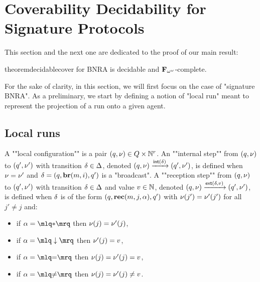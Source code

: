 \section{Coverability Decidability for Signature Protocols}
\label{sec:cover-decidability}

This section and the next one are dedicated to the proof of our main result:

\begin{restatable}{theorem}{decidablecover}
\label{thm:decidable-cover}
\COVER for BNRA is decidable and $\mathbf{F}_{\omega^\omega}$-complete.
\end{restatable}

For the sake of clarity, in this section, we will first focus on the case of "signature BNRA". 
As a preliminary, we start by defining a notion of "local run" meant to represent the projection of a run onto a given agent.

\subsection{Local runs}
\AP A ""local configuration"" is a pair $(q, \nu) \in Q \times \mathbb{N}^r$.  
\AP An ""internal step"" from $(q,\nu)$ to $(q',\nu')$ with transition $\delta \in \Delta$, denoted $(q,\nu) \xrightarrow{\mathsf{int}(\delta)} (q',\nu')$, is defined when $\nu = \nu'$ and $\delta =(q, \textbf{br}(m, i), q')$ is a "broadcast".  
\AP A ""reception step"" from $(q,\nu)$ to $(q',\nu')$ with transition $\delta \in \Delta$ and value $v \in \mathbb{N}$, denoted $(q,\nu) \xrightarrow{\mathsf{ext}(\delta,v)} (q',\nu')$, is defined when $\delta$ is of the form $(q,\textbf{rec}(m, j, \alpha),q')$ with $\nu(j') = \nu'(j')$ for all $j' \neq j$ and:
	
	\begin{minipage}[t]{6cm}
		\begin{itemize}
			\item if $\anact = \quotemarks{\dummyact}$ 
			then $\nu(j) = \nu'(j)$,
			\item if $\anact = \quotemarks{\enregact}$ then $\nu'(j) = v$,
		\end{itemize}
	\end{minipage}
	\begin{minipage}[t]{6cm}
		\begin{itemize}
			\item if $\anact = \quotemarks{\eqtestact}$ then $\nu(j) = \nu'(j)= v$,
			\item if $\anact = \quotemarks{\diseqtestact}$ then $\nu(j) = \nu'(j) \ne v$.
		\end{itemize}
	\end{minipage}
	

